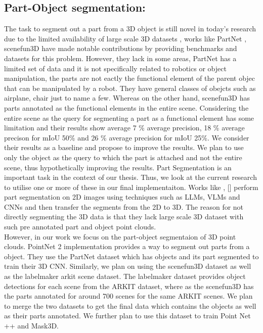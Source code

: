  \subsection{Part-Object segmentation:}
The task to segment out a part from a 3D object is still novel in today's research due to the limited availability of large scale 3D datasets
, works like PartNet \cite{Mo_2019_CVPR}, scenefun3D \cite{delitzas2024scenefun3d} have made notable contributions by providing benchmarks and datasets for this problem. 
However, they lack in some areas, PartNet has a limited set of data and it is not specifically related to robotics or object manipulation, the parts are not
eactly the functional element of the parent objec that can be manipulated by a robot. They have general
classes of obejcts such as airplane, chair just to name a few. Whereas on the other hand, scenefun3D has parts annotated as the functional elements in the entire scene. Considering
the entire scene as the query for segmenting a part as a functional element has some limitation and their results show average 7 \% average precision, 18 \% average precison for mIoU 
50\% and 26 \% average precision for mIoU 25\%. We consider their results as a baseline and propose to improve the results. 
We plan to use only the object as the query to which the part is attached and not the entire scene, thus hypothetically improving the results.
Part Segmentation is an important task in the context of our thesis. Thus, we look at the current research to utilise one or more of these
in our final implementaiton. Works like \cite{Liu_2023_CVPR}, \cite{10.1007/978-3-031-72652-1_25} [] perform part segmentation on 2D images using techniques such as LLMs, VLMs and CNNs and then transfer the 
segments from the 2D to 3D. The reason for not directly segmenting the 3D data is that they lack large scale 3D dataset with such pre annotated part
and object point clouds. \\
However, in our work we focus on the part-object segmentaion of 3D point clouds. PointNet 2 implementation provides a way to segment out parts from a object. 
They use the PartNet dataset which has objects and its part segmented to train their 3D CNN. Similarly, we plan on using the scenefun3D dataset as well as 
the labelmaker arkit scene dataset. The labelmaker dataset provides object detections for each scene from the ARKIT dataset, where as the scenefun3D has
the parts annotated for around 700 scenes for the same ARKIT scenes. We plan to merge the two datasets to get the final data which contains the objects as 
well as their parts annotated. We further plan to use this dataset to train Point Net ++ and Mask3D.
